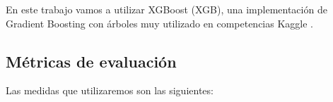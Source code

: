 En este trabajo vamos a utilizar XGBoost (XGB), una implementación de Gradient Boosting con árboles muy utilizado en competencias Kaggle \cite{xgboost}. 




\subsection{Métricas de evaluación}

Las medidas que utilizaremos son las siguientes:

